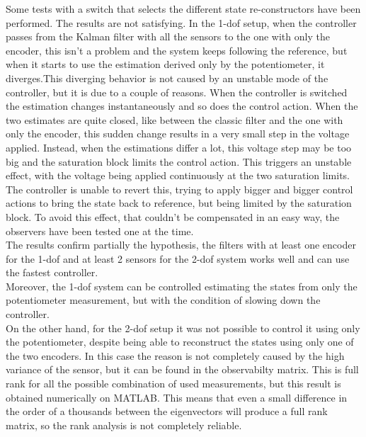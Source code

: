 Some tests with a switch that selects the different state re-constructors have been performed. The results are not satisfying. In the \acrshort{1-dof} setup, when the controller passes from the Kalman filter with all the sensors to the one with only the encoder, this isn't a problem and the system keeps following the reference, but when it starts to use the estimation derived only by the potentiometer, it diverges.This diverging behavior is not caused by an unstable mode of the controller, but it is due to a couple of reasons. When the controller is switched the estimation changes instantaneously and so does the control action. When the two estimates are quite closed, like between the classic filter and the one with only the encoder, this sudden change results in a very small step in the voltage applied. Instead, when the estimations differ a lot, this voltage step may be too big and the saturation block limits the control action. This triggers an unstable effect, with the voltage being applied continuously at the two saturation limits. The controller is unable to revert this, trying to apply bigger and bigger control actions to bring the state back to reference, but being limited by the saturation block. To avoid this effect, that couldn't be compensated in an easy way, the observers have been tested one at the time. \\

The results confirm partially the hypothesis, the filters with at least one encoder for the \acrshort{1-dof} and at least 2 sensors for the \acrshort{2-dof}  system works well and can use the fastest controller.\\
Moreover, the \acrshort{1-dof} system can be controlled estimating the states from only the potentiometer measurement, but with the condition of slowing down the controller.\\

On the other hand, for the \acrshort{2-dof} setup it was not possible to control it using only the potentiometer, despite being able to reconstruct the states using only one of the two encoders.
In this case the reason is not completely caused by the high variance of the sensor, but it can be found in the observabilty matrix. This is full rank for all the possible combination of used measurements, but this result is obtained numerically on MATLAB. This means that even a small difference in the order of a thousands between the eigenvectors will produce a full rank matrix, so the rank analysis is not completely reliable. \\ 

